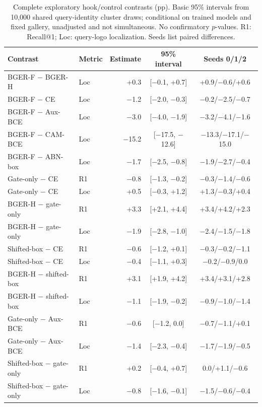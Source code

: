 \begin{table}[t]\centering\footnotesize\setlength{\tabcolsep}{4pt}
\caption{Complete exploratory hook/control contrasts (pp). Basic 95\% intervals from 10,000 shared query-identity cluster draws; conditional on trained models and fixed gallery, unadjusted and not simultaneous. No confirmatory $p$-values. R1: Recall@1; Loc: query-logo localization. Seeds list paired differences.}
\label{tab:posthoc-all}\begin{tabular}{llrcc}\toprule Contrast & Metric & Estimate & 95\% interval & Seeds 0/1/2\\\midrule
BGER-F $-$ BGER-H & Loc & +0.3 & [$-$0.1, +0.7] & +0.9/$-$0.6/+0.6\\
BGER-F $-$ CE & Loc & $-$1.2 & [$-$2.0, $-$0.3] & $-$0.2/$-$2.5/$-$0.7\\
BGER-F $-$ Aux-BCE & Loc & $-$3.0 & [$-$4.0, $-$1.9] & $-$3.2/$-$4.1/$-$1.6\\
BGER-F $-$ CAM-BCE & Loc & $-$15.2 & [$-$17.5, $-$12.6] & $-$13.3/$-$17.1/$-$15.0\\
BGER-F $-$ ABN-box & Loc & $-$1.7 & [$-$2.5, $-$0.8] & $-$1.9/$-$2.7/$-$0.4\\
Gate-only $-$ CE & R1 & $-$0.8 & [$-$1.3, $-$0.2] & $-$0.3/$-$1.4/$-$0.6\\
Gate-only $-$ CE & Loc & +0.5 & [$-$0.3, +1.2] & +1.3/$-$0.3/+0.4\\
BGER-H $-$ gate-only & R1 & +3.3 & [+2.1, +4.4] & +3.4/+4.2/+2.3\\
BGER-H $-$ gate-only & Loc & $-$1.9 & [$-$2.8, $-$1.0] & $-$2.4/$-$1.5/$-$1.8\\
Shifted-box $-$ CE & R1 & $-$0.6 & [$-$1.2, +0.1] & $-$0.3/$-$0.2/$-$1.1\\
Shifted-box $-$ CE & Loc & $-$0.4 & [$-$1.1, +0.3] & $-$0.2/$-$0.9/0.0\\
BGER-H $-$ shifted-box & R1 & +3.1 & [+1.9, +4.2] & +3.4/+3.1/+2.8\\
BGER-H $-$ shifted-box & Loc & $-$1.1 & [$-$1.9, $-$0.2] & $-$0.9/$-$1.0/$-$1.4\\
Gate-only $-$ Aux-BCE & R1 & $-$0.6 & [$-$1.2, 0.0] & $-$0.7/$-$1.1/+0.1\\
Gate-only $-$ Aux-BCE & Loc & $-$1.4 & [$-$2.3, $-$0.4] & $-$1.7/$-$1.9/$-$0.5\\
Shifted-box $-$ gate-only & R1 & +0.2 & [$-$0.4, +0.7] & 0.0/+1.1/$-$0.6\\
Shifted-box $-$ gate-only & Loc & $-$0.8 & [$-$1.6, $-$0.1] & $-$1.5/$-$0.6/$-$0.4\\
\bottomrule\end{tabular}\end{table}
